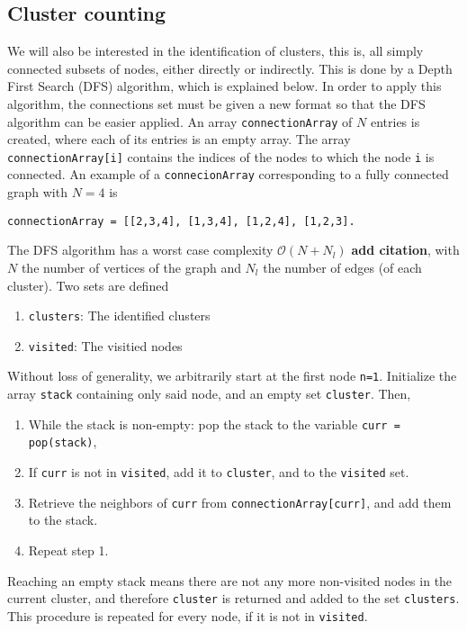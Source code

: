 \subsection{Cluster counting}

We will also be interested in the identification of clusters, this is, all simply connected subsets of nodes, either directly or indirectly. This is done by a Depth First Search (DFS) algorithm, which is explained below.
In order to apply this algorithm, the connections set must be given a new format so that the DFS algorithm can be easier applied. An array \texttt{connectionArray} of $N$ entries is created, where each of its entries is an empty array. The array \texttt{connectionArray[i]} contains the indices of the nodes to which the node \texttt{i} is connected. An example of a \texttt{connecionArray} corresponding to a fully connected graph with $N=4$ is
\begin{lstlisting}
connectionArray = [[2,3,4], [1,3,4], [1,2,4], [1,2,3].
\end{lstlisting}

The DFS algorithm has a worst case complexity $\mathcal{O}(N + N_l)$ \textbf{add citation}, with $N$ the number of vertices of the graph and $N_l$ the number of edges (of each cluster).  Two sets are defined
\begin{enumerate}
	\item \texttt{clusters}: The identified clusters
	\item \texttt{visited}: The visitied nodes
\end{enumerate}

Without loss of generality, we arbitrarily start at  the first node \texttt{n=1}. Initialize the array \texttt{stack} containing only said node, and an empty set \texttt{cluster}. Then,
\begin{enumerate}
	\item While the stack is non-empty: pop the stack to the variable \texttt{curr = pop(stack)},
	\item  If \texttt{curr} is not in \texttt{visited}, add it to \texttt{cluster}, and to the \texttt{visited} set.
	\item Retrieve the neighbors of \texttt{curr} from \texttt{connectionArray[curr]}, and add them to the stack.
	\item Repeat step 1.
\end{enumerate}
Reaching an empty stack means there are not any more non-visited nodes in the current cluster, and therefore \texttt{cluster} is returned and added to the set \texttt{clusters}.
This procedure is repeated for every node, if it is not in \texttt{visited}.

